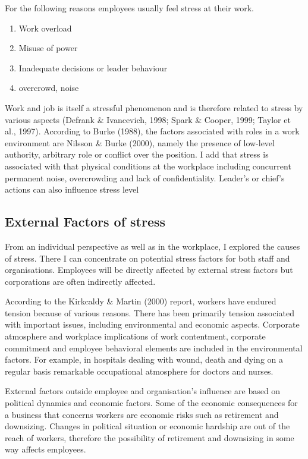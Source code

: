 For the following reasons employees usually feel stress at their work.
\begin{enumerate}
    \item Work overload
    \item Misuse of power
    \item Inadequate decisions or leader behaviour
    \item overcrowd, noise
\end{enumerate}


Work and job is itself a stressful phenomenon and is therefore related to stress by various aspects (Defrank \& Ivancevich, 1998; Spark \& Cooper, 1999; Taylor et al., 1997). According to Burke (1988), the factors associated with roles in a work environment are Nilsson \& Burke (2000), namely the presence of low-level authority, arbitrary role or conflict over the position. I add that stress is associated with that physical conditions at the workplace including concurrent permanent noise, overcrowding and lack of confidentiality. Leader's or chief's actions can also influence stress level \cite[p.9]{Fairbrother2003WorkplaceSatisfaction}

\subsection{External Factors of stress}

From an individual perspective as well as in the workplace, I explored the causes of stress. There I can concentrate on potential stress factors for both staff and organisations. Employees will be directly affected by external stress factors but corporations are often indirectly affected.

According to the Kirkcaldy \& Martin (2000) report, workers have endured tension because of various reasons. There has been primarily tension associated with important issues, including environmental and economic aspects.   Corporate atmosphere and workplace implications of work contentment, corporate commitment and employee behavioral elements are included in the environmental factors.   For example, in hospitals dealing with wound, death and dying on a regular basis remarkable occupational atmosphere for doctors and nurses. \citet[p.10]{Fairbrother2003WorkplaceSatisfaction}

External factors outside employee and organisation's influence are based on political dynamics and economic factors.  Some of the economic consequences for a business that concerns workers are economic risks such as retirement and downsizing. Changes in political situation or economic hardship are out of the reach of workers, therefore the possibility of retirement and downsizing in some way affects employees. \cite[p.320]{Bloisi2007ManagementBehaviour}

